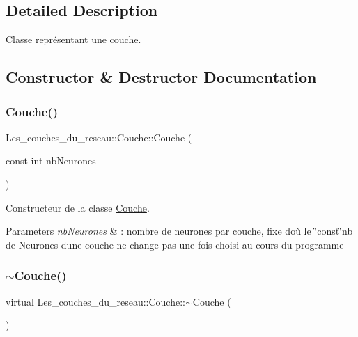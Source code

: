 \subsection{Detailed Description}
Classe représentant une couche. 

\subsection{Constructor \& Destructor Documentation}
\mbox{\label{class_les__couches__du__reseau_1_1_couche_af564932d3de118cead9fcc504e237285}} 
\subsubsection{\texorpdfstring{Couche()}{Couche()}}
{\footnotesize\ttfamily Les\+\_\+couches\+\_\+du\+\_\+reseau\+::\+Couche\+::\+Couche (\begin{DoxyParamCaption}\item[{const int}]{nb\+Neurones }\end{DoxyParamCaption})}



Constructeur de la classe \hyperlink{class_les__couches__du__reseau_1_1_couche}{Couche}. 


\begin{DoxyParams}{Parameters}
{\em nb\+Neurones} & \+: nombre de neurones par couche, fixe d\textquotesingle{}où le \char`\"{}const\char`\"{}nb de Neurones d\textquotesingle{}une couche ne change pas une fois choisi au cours du programme \\
\hline
\end{DoxyParams}
\mbox{\label{class_les__couches__du__reseau_1_1_couche_ad6b0be0bb3de03b0364a23cd64cfc052}} 
\subsubsection{\texorpdfstring{$\sim$\+Couche()}{~Couche()}}
{\footnotesize\ttfamily virtual Les\+\_\+couches\+\_\+du\+\_\+reseau\+::\+Couche\+::$\sim$\+Couche (\begin{DoxyParamCaption}{ }\end{DoxyParamCaption})\hspace{0.3cm}{\ttfamily [virtual]}}



